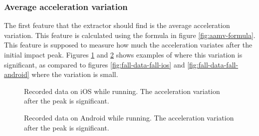\documentclass[12pt, a4paper, onecolumn]{article}
\begin{document}
	
	
	\subsubsection{Average acceleration variation}
	
	The first feature that the extractor should find is the average acceleration variation. This feature is calculated using the formula in figure \ref{fig:aamv-formula}. This feature is supposed to measure how much the acceleration variates after the initial impact peak. Figures \ref{fig:fall-data-run-ios} and \ref{fig:fall-data-run-android} shows examples of where this variation is significant, as compared to figures \ref{fig:fall-data-fall-ios} and \ref{fig:fall-data-fall-android} where the variation is small.
	
	\begin{figure}[H]
		\centering
		\caption{Recorded data on iOS while running. The acceleration variation after the peak is significant.}%
		\label{fig:fall-data-run-ios}%
	\end{figure}
	
	\begin{figure}[H]
		\centering
		\caption{Recorded data on Android while running. The acceleration variation after the peak is significant.}%
		\label{fig:fall-data-run-android}%
	\end{figure}
	
\end{document}
